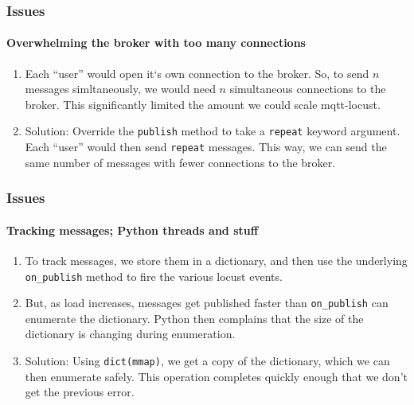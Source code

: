 \documentclass{beamer}
\begin{document}
\begin{frame}
    \frametitle{Issues}
    \framesubtitle{Overwhelming the broker with too many connections}
    \begin{enumerate}
        \item Each ``user'' would open it`s own connection to the broker. So,
        to send $n$ messages simltaneously, we would need $n$ simultaneous
        connections to the broker. This significantly limited the amount we
        could scale mqtt-locust.

        \item Solution: Override the \texttt{publish} method to take a
        \texttt{repeat} keyword argument. Each ``user'' would then send
        \texttt{repeat} messages. This way, we can send the same number of
        messages with fewer connections to the broker.
    \end{enumerate}
\end{frame}

\begin{frame}
    \frametitle{Issues}
    \framesubtitle{Tracking messages; Python threads and stuff}
    \begin{enumerate}
        \item To track messages, we store them in a dictionary, and then use
        the underlying \texttt{on\_publish} method to fire the various locust
        events.

        \item But, as load increases, messages get published faster than
        \texttt{on\_publish} can enumerate the dictionary. Python then
        complains that the size of the dictionary is changing during
        enumeration.

        \item Solution: Using \texttt{dict(mmap)}, we get a copy of the
        dictionary, which we can then enumerate safely. This operation
        completes quickly enough that we don't get the previous error.
    \end{enumerate}
\end{frame}
\end{document}
